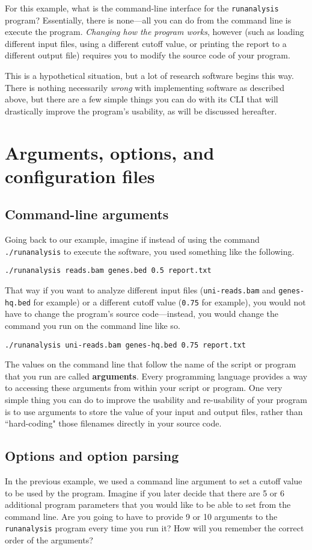 \documentclass{article}
\begin{document}
For this example, what is the command-line interface for the \texttt{runanalysis} program?
Essentially, there is none---all you can do from the command line is execute the program.
\textit{Changing how the program works}, however (such as loading different input files, using a different cutoff value, or printing the report to a different output file) requires you to modify the source code of your program.

This is a hypothetical situation, but a lot of research software begins this way.
There is nothing necessarily \textit{wrong} with implementing software as described above, but there are a few simple things you can do with its CLI that will drastically improve the program's usability, as will be discussed hereafter.

\section{Arguments, options, and configuration files}

\subsection{Command-line arguments}
Going back to our example, imagine if instead of using the command \texttt{./runanalysis} to execute the software, you used something like the following.
\begin{verbatim}
./runanalysis reads.bam genes.bed 0.5 report.txt
\end{verbatim}
That way if you want to analyze different input files (\texttt{uni-reads.bam} and \texttt{genes-hq.bed} for example) or a different cutoff value (\texttt{0.75} for example), you would not have to change the program's source code---instead, you would change the command you run on the command line like so.
\begin{verbatim}
./runanalysis uni-reads.bam genes-hq.bed 0.75 report.txt
\end{verbatim}
The values on the command line that follow the name of the script or program that you run are called \textbf{arguments}.
Every programming language provides a way to accessing these arguments from within your script or program.
One very simple thing you can do to improve the usability and re-usability of your program is to use arguments to store the value of your input and output files, rather than ``hard-coding" those filenames directly in your source code.

\subsection{Options and option parsing}
In the previous example, we used a command line argument to set a cutoff value to be used by the program. Imagine if you later decide that there are 5 or 6 additional program parameters that you would like to be able to set from the command line. Are you going to have to provide 9 or 10 arguments to the \texttt{runanalysis} program every time you run it? How will you remember the correct order of the arguments?
\end{document}
